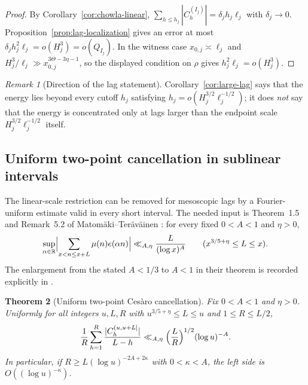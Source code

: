 \documentclass[11pt]{amsart}
\numberwithin{equation}{section}
\theoremstyle{plain}
\newtheorem{theorem}{Theorem}[section]
\theoremstyle{definition}
\theoremstyle{remark}
\newtheorem{remark}[theorem]{Remark}
\begin{document}
\begin{proof}
By Corollary~\ref{cor:chowla-linear},
$\sum_{h\le h_j}|C^{(I_j)}_h|=\delta_jh_j\ell_j$ with $\delta_j\to0$.
Proposition~\ref{prop:lag-localization} gives an error at most
$\delta_jh_j^2\ell_j=o(H_j^3)=o(Q_{I_j})$. In the witness case
$x_{0,j}\asymp\ell_j$ and
$H_j^3/\ell_j\gg x_{0,j}^{3\Theta-3\eta-1}$, so the displayed condition on
$\rho$ gives $h_j^2\ell_j=o(H_j^3)$.
\end{proof}

\begin{remark}[Direction of the lag statement]
\label{rem:large-lag-direction}
Corollary~\ref{cor:large-lag} says that the energy lies beyond every cutoff
$h_j$ satisfying $h_j=o(H_j^{3/2}\ell_j^{-1/2})$; it does \emph{not} say
that the energy is concentrated only at lags larger than the endpoint scale
$H_j^{3/2}\ell_j^{-1/2}$ itself.
\end{remark}

\subsection{Uniform two-point cancellation in sublinear intervals}
\label{subsec:sublinear-chowla}

The linear-scale restriction can be removed for mesoscopic lags by a
Fourier-uniform estimate valid in every short interval. The needed input is
Theorem~1.5 and Remark~5.2 of Matom\"aki--Ter\"av\"ainen
\cite{MatomakiTeravainen2023}: for every fixed $0<A<1$ and $\eta>0$,
\begin{equation}
\label{eq:MT-fourier}
\sup_{\alpha\in\mathbb R}\Bigl|\sum_{x<n\le x+L}\mu(n)e(\alpha n)\Bigr|
\ll_{A,\eta}\frac{L}{(\log x)^A}
\qquad(x^{3/5+\eta}\le L\le x).
\end{equation}
The enlargement from the stated $A<1/3$ to $A<1$ in their theorem is
recorded explicitly in \cite{MSTT23}.

\begin{theorem}[Uniform two-point Ces\`aro cancellation]
\label{thm:sublinear-two-point}
Fix $0<A<1$ and $\eta>0$. Uniformly for all integers $u,L,R$ with
$u^{3/5+\eta}\le L\le u$ and $1\le R\le L/2$,
\begin{equation}
\label{eq:sublinear-two-point}
\frac1R\sum_{h=1}^{R}\frac{|C^{(u,u+L]}_h|}{L-h}
\ll_{A,\eta}\Bigl(\frac LR\Bigr)^{1/2}(\log u)^{-A}.
\end{equation}
In particular, if $R\ge L(\log u)^{-2A+2\kappa}$ with
$0<\kappa<A$, the left side is $O((\log u)^{-\kappa})$.
\end{theorem}
\end{document}
